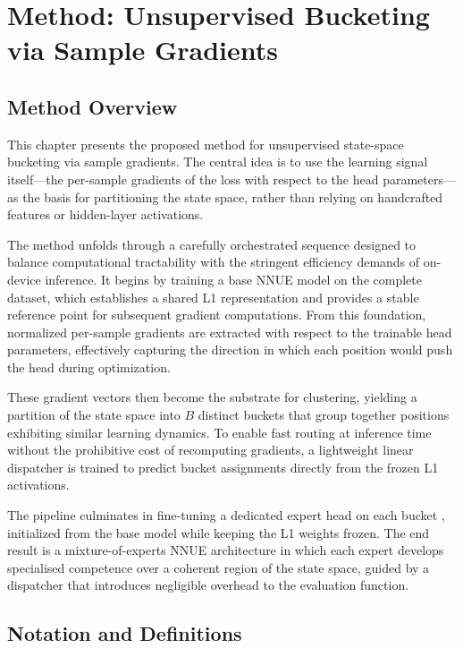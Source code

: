 \chapter{Method: Unsupervised Bucketing via Sample Gradients}










\section{Method Overview}

This chapter presents the proposed method for unsupervised state-space bucketing via sample gradients. The central idea is to use the learning signal itself---the per-sample gradients of the loss with respect to the head parameters---as the basis for partitioning the state space, rather than relying on handcrafted features or hidden-layer activations.

The method unfolds through a carefully orchestrated sequence designed to balance computational tractability with the stringent efficiency demands of on-device inference. It begins by training a base NNUE model on the complete dataset, which establishes a shared L1 representation and provides a stable reference point for subsequent gradient computations. From this foundation, normalized per-sample gradients are extracted with respect to the trainable head parameters, effectively capturing the direction in which each position would push the head during optimization.

These gradient vectors then become the substrate for clustering, yielding a partition of the state space into $B$ distinct buckets that group together positions exhibiting similar learning dynamics. To enable fast routing at inference time without the prohibitive cost of recomputing gradients, a lightweight linear dispatcher is trained to predict bucket assignments directly from the frozen L1 activations.

The pipeline culminates in fine-tuning a dedicated expert head on each bucket , initialized from the base model while keeping the L1 weights frozen. The end result is a mixture-of-experts NNUE architecture in which each expert develops specialised competence over a coherent region of the state space, guided by a dispatcher that introduces negligible overhead to the evaluation function.

\section{Notation and Definitions}


